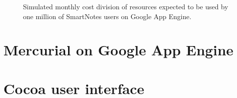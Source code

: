 \begin{figure}[ht]
  \begin{center}
  \end{center}
  \caption{Simulated monthly cost division of resources expected to be used by one million of SmartNotes users on Google App Engine.}
  \label{fig:gae_cost}
\end{figure}


\section{Mercurial on Google App Engine}\label{sec:hg_on_gae}
\section{Cocoa user interface}\label{sec:cocoa}
